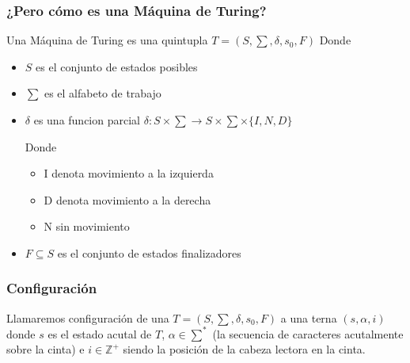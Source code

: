 \documentclass{beamer}                  %
\begin{document}
    \begin{frame}
        \frametitle{¿Pero cómo es una Máquina de Turing?}
        Una Máquina de Turing es una quintupla
        \center
        $T=(S,\sum,\delta,s_{0},F)$
        \endcenter
        Donde
        \begin{itemize}
            \item $S$ es el conjunto de estados posibles
            \item $\sum$ es el alfabeto de trabajo
            \item $\delta$ es una funcion parcial $\delta:S \times \sum \rightarrow S \times \sum \times \{ I, N, D\}$
                
                Donde
                \begin{itemize}
                    \item I denota movimiento a la izquierda
                    \item D denota movimiento a la derecha
                    \item N sin movimiento
                \end{itemize}
            \item $F \subseteq S$ es el conjunto de estados finalizadores

        \end{itemize}
    \end{frame}
    
    \begin{frame}
        \frametitle{Configuración}
        Llamaremos configuración de una $T=(S,\sum,\delta,s_{0},F)$ a una terna $(s,\alpha,i)$ donde $s$ es el estado acutal de $T$, $\alpha \in \sum^{*}$ (la secuencia de caracteres acutalmente sobre la cinta) e $i \in \mathbb{Z}^{+}$ siendo la posición de la cabeza lectora en la cinta.
    \end{frame}
\end{document}
